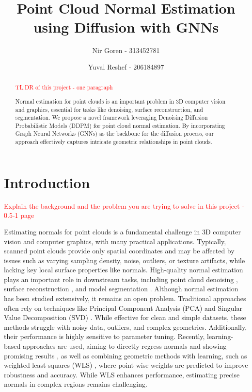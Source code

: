\documentclass{acmart}
\title{Point Cloud Normal Estimation using Diffusion with GNNs}
\author{Nir Goren - 313452781}
\author{Yuval Reshef - 206184897}
\date{}
\begin{document}
\begin{abstract}
\textcolor{red}{TL;DR of this project -  one paragraph}

Normal estimation for point clouds is an important problem in 3D computer vision and graphics, essential for tasks like denoising, surface reconstruction, and segmentation. We propose a novel framework leveraging Denoising Diffusion Probabilistic Models (DDPM) for point cloud normal estimation. By incorporating Graph Neural Networks (GNNs) as the backbone for the diffusion process, our approach effectively captures intricate geometric relationships in point clouds.
\end{abstract}
\maketitle

\section{Introduction}
\textcolor{red}{Explain the background and the problem you are trying to solve in this project - 0.5-1 page}

Estimating normals for point clouds is a fundamental challenge in 3D computer vision and computer graphics, with many practical applications. Typically, scanned point clouds provide only spatial coordinates and may be affected by issues such as varying sampling density, noise, outliers, or texture artifacts, while lacking key local surface properties like normals. High-quality normal estimation plays an important role in downstream tasks, including point cloud denoising \cite{lu2020deep,lu2020low}, surface reconstruction \cite{kazhdan2006poisson,fleishman2005robust}, and model segmentation \cite{che2018multi}.
Although normal estimation has been studied extensively, it remains an open problem. Traditional approaches often rely on techniques like Principal Component Analysis (PCA) \cite{hoppe1992surface} and Singular Value Decomposition (SVD) \cite{pauly2002efficient}. While effective for clean and simple datasets, these methods struggle with noisy data, outliers, and complex geometries. Additionally, their performance is highly sensitive to parameter tuning.
Recently, learning-based approaches are used, aiming to directly regress normals and showing promising results \cite{guerrero2018pcpnet,ben2019nesti,zhou2020geometry,wang2020neighbourhood,hashimoto2019normal}, as well as combining geometric methods with learning, such as weighted least-squares (WLS) \cite{lenssen2020deep,ben2020deepfit,zhang2022geometry,zhu2021adafit}, where point-wise weights are predicted to improve robustness and accuracy. While WLS enhances performance, estimating precise normals in complex regions remains challenging.
\end{document}
